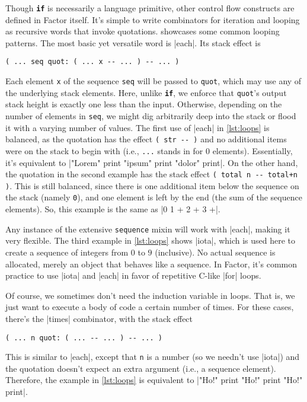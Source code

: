 
Though \texttt{\textbf{if}} is necessarily a language primitive, other control
flow constructs are defined in Factor itself.  It's simple to write combinators
for iteration and looping as recursive words that invoke quotations.
 showcases some common looping patterns.  The most basic yet
versatile word is \factor|each|.  Its stack effect is
%
\begin{center}
%
  \Verb|( ... seq quot: ( ... x -- ... ) -- ... )|
%
\end{center}
%
\noindent Each element \Verb|x| of the sequence \Verb|seq| will be passed to
\Verb|quot|, which may use any of the underlying stack elements.  Here, unlike
\texttt{\textbf{if}}, we enforce that \Verb|quot|'s output stack height is
exactly one less than the input.  Otherwise, depending on the number of
elements in \Verb|seq|, we might dig arbitrarily deep into the stack or flood
it with a varying number of values.  The first use of \factor|each| in
\vref{lst:loops} is balanced, as the quotation has the effect
%
\Verb|( str -- )|
%
and no additional items were on the stack to begin with (i.e., \Verb|...|
stands in for $0$ elements).  Essentially, it's equivalent to
%
\factor|"Lorem" print "ipsum" print "dolor" print|.
%
On the other hand, the quotation in the second example has the stack effect
%
\Verb|( total n -- total+n )|.
%
This is still balanced, since there is one additional item below the sequence
on the stack (namely \Verb|0|), and one element is left by the end (the sum of
the sequence elements).  So, this example is the same as
%
\factor|0 1 + 2 + 3 +|.


Any instance of the extensive \Verb|sequence| mixin will work with
\factor|each|, making it very flexible.  The third example in \vref{lst:loops}
shows \factor|iota|, which is used here to create a  sequence of
integers from $0$ to $9$ (inclusive).  No actual sequence is allocated, merely
an object that behaves like a sequence.  In Factor, it's common practice to use
\factor|iota| and \factor|each| in favor of repetitive C-like |for|
loops.

Of course, we sometimes don't need the induction variable in loops.  That is,
we just want to execute a body of code a certain number of times.  For these
cases, there's the \factor|times| combinator, with the stack effect
%
\begin{center}
%
  \Verb|( ... n quot: ( ... -- ... ) -- ... )|
%
\end{center}
%
\noindent This is similar to \factor|each|, except that \Verb|n| is a number
(so we needn't use \factor|iota|) and the quotation doesn't expect an extra
argument (i.e., a sequence element).  Therefore, the example in
\vref{lst:loops} is equivalent to
%
\factor|"Ho!" print "Ho!" print "Ho!" print|.

